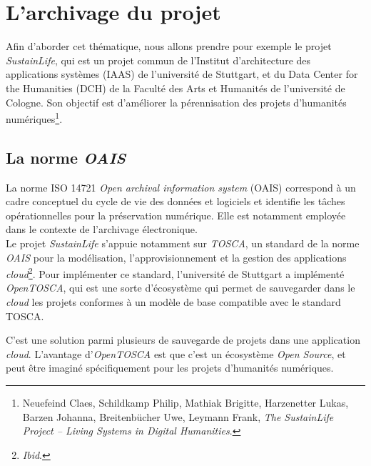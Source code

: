 \chapter{L'archivage du projet}

Afin d’aborder cet thématique, nous allons prendre pour exemple le projet \textit{SustainLife}, qui  est un projet commun de l’Institut d’architecture des applications systèmes (IAAS) de l’université de Stuttgart, et du Data Center for the Humanities (DCH) de la Faculté des Arts et Humanités de l’université de Cologne. Son objectif est d’améliorer la pérennisation des projets d’humanités numériques\footnote{Neuefeind Claes, Schildkamp Philip, Mathiak Brigitte, Harzenetter Lukas, Barzen Johanna, Breitenbücher Uwe, Leymann Frank, \textit{The SustainLife Project – Living Systems in Digital Humanities}.}.

    \section{La norme \textit{OAIS}}
La norme ISO 14721 \textit{Open archival information system} (OAIS) correspond à un cadre conceptuel du cycle de vie des données et logiciels et identifie les tâches opérationnelles pour la préservation numérique. Elle est notamment employée dans le contexte de l’archivage électronique.\\ 
Le projet \textit{SustainLife} s’appuie notamment sur \textit{TOSCA}, un standard de la norme \textit{OAIS} pour la modélisation, l’approvisionnement et la gestion des applications \textit{cloud}\footnote{\textit{Ibid}.}. Pour implémenter ce standard, l’université de Stuttgart a implémenté \textit{OpenTOSCA}, qui est une sorte d’écosystème qui permet de sauvegarder dans le \textit{cloud} les projets conformes à un modèle de base compatible avec le standard TOSCA.

C'est une solution parmi plusieurs de sauvegarde de projets dans une application \textit{cloud}. L'avantage d'\textit{OpenTOSCA} est que c'est un écosystème \textit{Open Source}, et peut être imaginé spécifiquement pour les projets d'humanités numériques.
 
